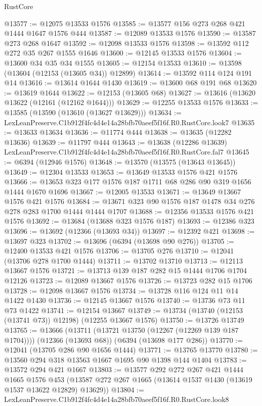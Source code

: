 \begin{lexlean}{RustCore}
\begin{coremodule}
@13577 := @12075 @13533 @1576
@13585 := @13577 @156 @273 @268 @421 @1444 @1647 @1576 @444
@13587 := @12089 @13533 @1576
@13590 := @13587 @273 @268 @1647
@13592 := @12098 @13533 @1576
@13598 := @13592 @112 @272 @35 @267 @1555 @1646
@13600 := @12145 @13533 @1576
@13604 := @13600 @34 @35 @34 @1555
@13605 := @12154 @13533
@13610 := @13598 (@13604 (@12153 (@13605 @34)) @12899)
@13614 := @13592 @114 @124 @191 @14
@13616 := @13614 @1644 @1430
@13619 := @13600 @68 @191 @68
@13620 := @13619 @1644
@13622 := @12153 (@13605 @68)
@13627 := @13616 (@13620 @13622 (@12161 (@12162 @1644)))
@13629 := @12255 @13533 @1576
@13633 := @13585 (@13590 (@13610 (@13627 @13629)))
@13634 := LexLeanPreserve.C1b912f4fc4d4e14a28bfb70aeef5f16f.R0.RustCore.look7
@13635 := @13633 @13634
@13636 := @11774 @444
@13638 := @13635 (@12282 @13636)
@13639 := @11797 @444
@13643 := @13638 (@12286 @13639) LexLeanPreserve.C1b912f4fc4d4e14a28bfb70aeef5f16f.R0.RustCore.fal7
@13645 := @6394 (@12946 @1576)
@13648 := @13570 (@13575 (@13643 @13645))
@13649 := @12304 @13533
@13653 := @13649 @13533 @1576 @421 @1576
@13666 := @13653 @323 @177 @1576 @187 @1711 @68 @286 @90 @319 @1656 @1444 @1670 @1696
@13667 := @12005 @13533
@13671 := @13649 @13667 @1576 @421 @1576
@13684 := @13671 @323 @90 @1576 @187 @1478 @34 @276 @278 @283 @1700 @1444 @1444 @1707
@13688 := @12356 @13533 @1576 @421 @1576
@13692 := @13684 (@13688 @323 @1576 @187)
@13693 := @12386 @323
@13696 := @13692 (@12366 (@13693 @34))
@13697 := @12392 @421
@13698 := @13697 @323
@13702 := @13696 (@6394 (@13698 @90 @276))
@13705 := @12400 @13533 @421 @1576
@13706 := @13705 @276
@13710 := @12041 (@13706 @278 @1700 @1444)
@13711 := @13702 @13710
@13713 := @12113 @13667 @1576
@13721 := @13713 @139 @187 @282 @15 @1444 @1706 @1704 @12126
@13723 := @12089 @13667 @1576
@13726 := @13723 @282 @15 @1706
@13728 := @12098 @13667 @1576
@13734 := @13728 @116 @124 @11 @14 @1422 @1430
@13736 := @12145 @13667 @1576
@13740 := @13736 @73 @11 @73 @1422
@13741 := @12154 @13667
@13749 := @13734 (@13740 (@12153 (@13741 @73)) @12198) (@12255 @13667 @1576)
@13750 := @13726 @13749
@13765 := @13666
    (@13711 (@13721 @13750 (@12267 (@12269 @139 @187 @1704))))
    (@12366 (@13693 @68))
    (@6394 (@13698 @177 @286))
@13770 := @12041 (@13705 @286 @90 @1656 @1444)
@13771 := @13765 @13770
@13780 := @13560 @294 @318 @13563 @1667 @1695 @90 @1398 @144 @1404
@13783 := @13572 @294 @421 @1667
@13803 := @13577
    @292
    @272
    @267
    @421
    @1444
    @1665
    @1576
    @453
    (@13587 @272 @267 @1665 (@13614 @1537 @1430 (@13619 @1537 @13622 @12829) @13629))
@13804 := LexLeanPreserve.C1b912f4fc4d4e14a28bfb70aeef5f16f.R0.RustCore.look8

\end{coremodule}
\end{lexlean}
